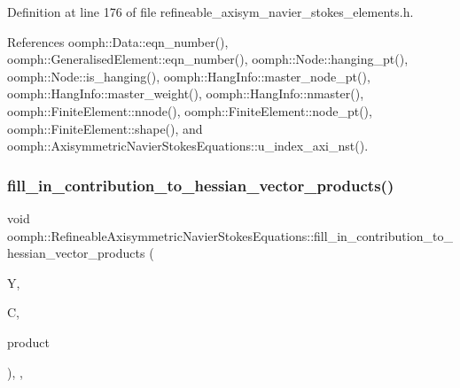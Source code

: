 Definition at line 176 of file refineable\+\_\+axisym\+\_\+navier\+\_\+stokes\+\_\+elements.\+h.



References oomph\+::\+Data\+::eqn\+\_\+number(), oomph\+::\+Generalised\+Element\+::eqn\+\_\+number(), oomph\+::\+Node\+::hanging\+\_\+pt(), oomph\+::\+Node\+::is\+\_\+hanging(), oomph\+::\+Hang\+Info\+::master\+\_\+node\+\_\+pt(), oomph\+::\+Hang\+Info\+::master\+\_\+weight(), oomph\+::\+Hang\+Info\+::nmaster(), oomph\+::\+Finite\+Element\+::nnode(), oomph\+::\+Finite\+Element\+::node\+\_\+pt(), oomph\+::\+Finite\+Element\+::shape(), and oomph\+::\+Axisymmetric\+Navier\+Stokes\+Equations\+::u\+\_\+index\+\_\+axi\+\_\+nst().

\mbox{\label{classoomph_1_1RefineableAxisymmetricNavierStokesEquations_aceeb8beea173139f943043d2dd47bb19}} 
\subsubsection{\texorpdfstring{fill\+\_\+in\+\_\+contribution\+\_\+to\+\_\+hessian\+\_\+vector\+\_\+products()}{fill\_in\_contribution\_to\_hessian\_vector\_products()}}
{\footnotesize\ttfamily void oomph\+::\+Refineable\+Axisymmetric\+Navier\+Stokes\+Equations\+::fill\+\_\+in\+\_\+contribution\+\_\+to\+\_\+hessian\+\_\+vector\+\_\+products (\begin{DoxyParamCaption}\item[{\hyperlink{classoomph_1_1Vector}{Vector}$<$ double $>$ const \&}]{Y,  }\item[{\hyperlink{classoomph_1_1DenseMatrix}{Dense\+Matrix}$<$ double $>$ const \&}]{C,  }\item[{\hyperlink{classoomph_1_1DenseMatrix}{Dense\+Matrix}$<$ double $>$ \&}]{product }\end{DoxyParamCaption})\hspace{0.3cm}{\ttfamily [inline]}, {\ttfamily [private]}, {\ttfamily [virtual]}}



